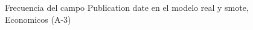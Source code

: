 \begin{figure}[H]
    \centering
    
    \caption{Frecuencia del campo Publication date en el modelo real y smote, Economicos (A-3)}
    \label{frecuency-Publication Date-smote-enc}
\end{figure}
